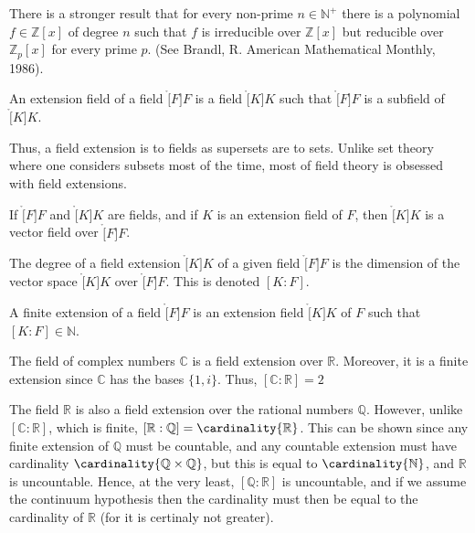     There is a stronger result that for every non-prime
    $n\in\mathbb{N}^{+}$ there is a polynomial $f\in\mathbb{Z}[x]$ of degree
    $n$ such that $f$ is irreducible over $\mathbb{Z}[x]$ but reducible
    over $\mathbb{Z}_{p}[x]$ for every prime $p$.
    (See Brandl, R. American Mathematical Monthly, 1986).
    \begin{definition}
        An extension field of a field $\ring[F]{F}$ is a field $\ring[K]{K}$
        such that $\ring[F]{F}$ is a subfield of $\ring[K]{K}$.
    \end{definition}
    Thus, a field extension is to fields as supersets are to sets. Unlike
    set theory where one considers subsets most of the time, most of field
    theory is obsessed with field extensions.
    \begin{theorem}
        If $\ring[F]{F}$ and $\ring[K]{K}$ are fields, and if $K$ is an
        extension field of $F$, then $\ring[K]{K}$ is a vector field
        over $\ring[F]{F}$.
    \end{theorem}
    \begin{definition}
        The degree of a field extension $\ring[K]{K}$ of a given field
        $\ring[F]{F}$ is the dimension of the vector space
        $\ring[K]{K}$ over $\ring[F]{F}$. This is denoted $[K:F]$.
    \end{definition}
    \begin{definition}
        A finite extension of a field $\ring[F]{F}$ is an extension field
        $\ring[K]{K}$ of $F$ such that $[K:F]\in\mathbb{N}$.
    \end{definition}
    \begin{example}
        The field of complex numbers $\mathbb{C}$ is a field extension over
        $\mathbb{R}$. Moreover, it is a finite extension since $\mathbb{C}$
        has the bases $\{1,i\}$. Thus, $[\mathbb{C}:\mathbb{R}]=2$
    \end{example}
    \begin{example}
        The field $\mathbb{R}$ is also a field extension over the rational
        numbers $\mathbb{Q}$. However, unlike $[\mathbb{C}:\mathbb{R}]$,
        which is finite, $[\mathbb{R}:\mathbb{Q}]=\cardinality{\mathbb{R}}$.
        This can be shown since any finite extension of $\mathbb{Q}$ must
        be countable, and any countable extension must have cardinality
        $\cardinality{\mathbb{Q}\times\mathbb{Q}}$, but this is equal to
        $\cardinality{\mathbb{N}}$, and $\mathbb{R}$ is uncountable. Hence,
        at the very least, $[\mathbb{Q}:\mathbb{R}]$ is uncountable, and if
        we assume the continuum hypothesis then the cardinality must then
        be equal to the cardinality of $\mathbb{R}$ (for it is certinaly not
        greater).
    \end{example}
